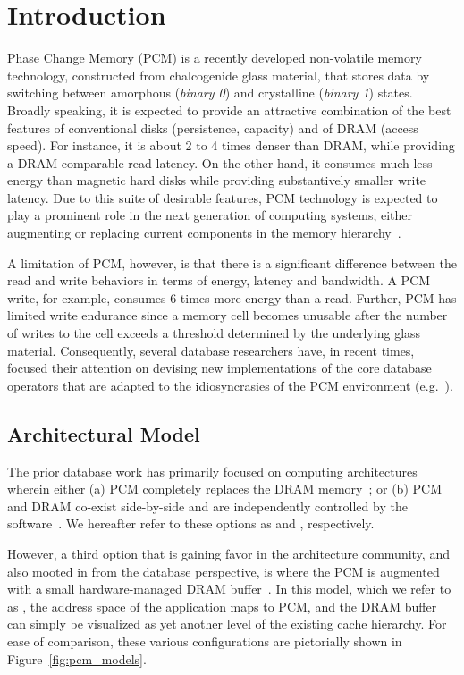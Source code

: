 \section{Introduction}
\label{sec:intro}
%
Phase Change Memory (PCM) is a recently developed non-volatile memory
technology, constructed from chalcogenide glass material, that stores
data by switching between amorphous (\emph{binary 0}) and crystalline 
(\emph{binary 1}) states. Broadly speaking, it is expected to provide an attractive
combination of the best features of conventional disks (persistence,
capacity) and of DRAM (access speed). For instance, it is
about 2 to 4 times denser than DRAM, while providing a DRAM-comparable
read latency.  On the other hand, it consumes much less energy
than magnetic hard disks while providing substantively smaller write latency. Due to this suite of  desirable features, PCM technology is
expected to play a prominent role in the next generation of computing
systems, either augmenting or replacing current components in the memory
hierarchy~\cite{qureshi,zhou,lee}.

A limitation of PCM, however, is that there is a significant difference
between the read and write behaviors in terms of energy, latency and
bandwidth. A PCM write, for example, consumes 6 times more energy than
a read. Further, PCM has limited write endurance since a memory cell
becomes unusable after the number of writes to the cell exceeds a threshold
determined by the underlying glass material. Consequently, several database
researchers have, in recent times, focused their attention on devising
new implementations of the core database operators that are adapted to
the idiosyncrasies of the PCM environment (e.g.~\cite{chen,viglas}). 

\subsection*{Architectural Model}
The prior database work has primarily focused on computing
architectures wherein either (a) PCM completely replaces the
DRAM memory~\cite{chen}; or (b) PCM and DRAM co-exist side-by-side
and are independently controlled by the software~\cite{viglas}. We
hereafter refer to these options as {\bf \modelPcmRam{}} and
{\bf \modelExplicit{}}, respectively.

However, a third option that is gaining favor in the architecture
community, and also mooted in \cite{chen} from the database
perspective, is where the PCM is augmented with a small hardware-managed
DRAM buffer~\cite{qureshi}. In this model, which we refer to as {\bf
\model{}}, the address space of the application maps to PCM, and the DRAM
buffer can simply be visualized as yet another level of the existing
cache hierarchy.  For ease of comparison, these various configurations
are pictorially shown in Figure~\ref{fig:pcm_models}.

